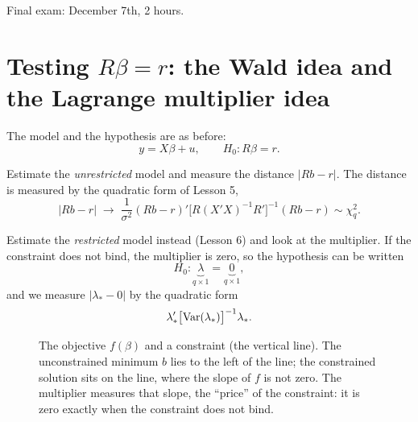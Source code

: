 \documentclass[11pt]{article}
\begin{document}

 Final exam: December 7th, 2 hours.

\section{Testing $R\beta = r$: the Wald idea and the Lagrange multiplier idea}

The model and the hypothesis are as before:
\[ y = X\beta + u, \qquad H_{0} : R\beta = r . \]

Estimate the \emph{unrestricted} model and measure the distance $|Rb - r|$. The
distance is measured by the quadratic form of Lesson 5,
\[ |Rb - r| \;\longrightarrow\;
   \frac{1}{\sigma^{2}}(Rb - r)'\bigl[R(X'X)^{-1}R'\bigr]^{-1}(Rb - r) \sim \chi^{2}_{q}. \]

Estimate the \emph{restricted} model instead (Lesson 6) and look at the multiplier.
If the constraint does not bind, the multiplier is zero, so the hypothesis can be
written
\[ H_{0} : \underbrace{\lambda}_{q\times1} = \underbrace{0}_{q\times1}, \]
and we measure $|\lambda_{*} - 0|$ by the quadratic form
\[ \lambda_{*}'\bigl[\operatorname{Var}(\lambda_{*})\bigr]^{-1}\lambda_{*}. \]

\begin{figure}[ht]
\centering
{}
\caption{The objective $f(\beta)$ and a constraint (the vertical line). The
unconstrained minimum $b$ lies to the left of the line; the constrained solution
sits on the line, where the slope of $f$ is not zero. The multiplier measures that
slope, the ``price'' of the constraint: it is zero exactly when the constraint does
not bind.}
\end{figure}
\end{document}
